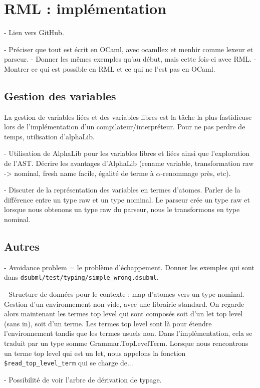 \chapter{RML : implémentation}
- Lien vers GitHub.

- Préciser que tout est écrit en OCaml, avec ocamllex et menhir comme lexeur et parseur.
- Donner les mêmes exemples qu'au début, mais cette fois-ci avec RML.
- Montrer ce qui est possible en RML et ce qui ne l'est pas en OCaml.

\section{Gestion des variables}

La gestion de variables liées et des variables libres est la tâche la plus
fastidieuse lors de l'implémentation d'un compilateur/interpréteur. Pour ne pas
perdre de temps, utilisation d'alphaLib.

- Utilisation de AlphaLib pour les variables libres et liées ainsi que
l'exploration de l'AST. Décrire les avantages d'AlphaLib (rename variable,
transformation raw -> nominal, fresh name facile, égalité de terme à
$\alpha$-renommage près, etc).

- Discuter de la représentation des variables en termes d'atomes. Parler de la
différence entre un type raw et un type nominal. Le parseur crée un type raw et
lorsque nous obtenons un type raw du parseur, nous le transformons en type nominal.

\section{Autres} 

- Avoidance problem = le problème d'échappement. Donner les exemples qui sont
dans \verb|dsubml/test/typing/simple_wrong.dsubml|.

- Structure de données pour le contexte : map d'atomes vers un type nominal.
- Gestion d'un environnement non vide, avec une librairie standard. On regarde
alors maintenant les termes top level qui sont composés soit d'un let top level
(sans in), soit d'un terme. Les termes top level sont là pour étendre
l'environnement tandis que les termes usuels non. Dans l'implémentation, cela se
traduit par un type somme Grammar.TopLevelTerm. Lorsque nous rencontrons un
terme top level qui est un let, nous appelons la fonction \verb|$read_top_level_term|
qui se charge de...

- Possibilité de voir l'arbre de dérivation de typage.

